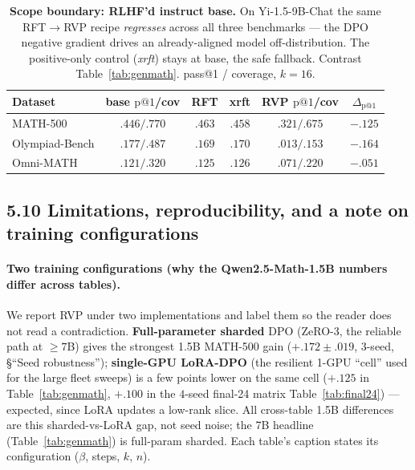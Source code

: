\begin{table}[htbp]
\centering
\caption{\textbf{Scope boundary: RLHF'd instruct base.} On Yi-1.5-9B-Chat the same RFT$\to$RVP
recipe \emph{regresses} across all three benchmarks --- the DPO negative gradient drives an
already-aligned model off-distribution. The positive-only control (\emph{xrft}) stays at base, the
safe fallback. Contrast Table~\ref{tab:genmath}. pass@1 / coverage, $k{=}16$.}
\label{tab:bigmath}
\begin{tabular}{lccccc}
\toprule
Dataset & base $\text{p}@1$/cov & RFT & xrft & RVP $\text{p}@1$/cov & $\Delta_{\text{p}@1}$ \\
\midrule
MATH-500       & $.446/.770$ & $.463$ & $.458$ & $.321/.675$ & $-.125$ \\
Olympiad-Bench & $.177/.487$ & $.169$ & $.170$ & $.013/.153$ & $-.164$ \\
Omni-MATH      & $.121/.320$ & $.125$ & $.126$ & $.071/.220$ & $-.051$ \\
\bottomrule
\end{tabular}
\end{table}

\subsection*{5.10 Limitations, reproducibility, and a note on training configurations}

\paragraph{Two training configurations (why the Qwen2.5-Math-1.5B numbers differ across tables).}
We report RVP under two implementations and label them so the reader does not read a contradiction.
\textbf{Full-parameter sharded} DPO (ZeRO-3, the reliable path at $\ge\!7$B) gives the strongest 1.5B
MATH-500 gain ($+.172{\pm}.019$, 3-seed, \S``Seed robustness''); \textbf{single-GPU LoRA-DPO} (the
resilient 1-GPU ``cell'' used for the large fleet sweeps) is a few points lower on the same cell
($+.125$ in Table~\ref{tab:genmath}, $+.100$ in the $4$-seed final-24 matrix Table~\ref{tab:final24}) ---
expected, since LoRA updates a low-rank slice. All cross-table 1.5B differences are this
sharded-vs-LoRA gap, not seed noise; the 7B headline (Table~\ref{tab:genmath}) is full-param sharded.
Each table's caption states its configuration ($\beta$, steps, $k$, $n$).

